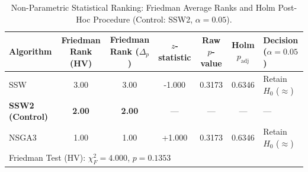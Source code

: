 \begin{table}[htbp]
\caption{Non-Parametric Statistical Ranking: Friedman Average Ranks and Holm Post-Hoc Procedure (Control: SSW2, $\alpha = 0.05$).}
\label{tab:ssw_friedman_holm}
\centering\small
\begin{tabular}{@{}l c c c c c l@{}}
\toprule
Algorithm & Friedman Rank (HV) & Friedman Rank ($\Delta_p$) & $z$-statistic & Raw $p$-value & Holm $p_{\text{adj}}$ & Decision ($\alpha=0.05$) \\
\midrule
SSW & 3.00 & 3.00 & -1.000 & 0.3173 & 0.6346 & Retain $H_0$ ($\approx$) \\
\textbf{SSW2 (Control)} & \textbf{2.00} & \textbf{2.00} & --- & --- & --- & --- \\
NSGA3 & 1.00 & 1.00 & +1.000 & 0.3173 & 0.6346 & Retain $H_0$ ($\approx$) \\
\midrule
\multicolumn{7}{l}{Friedman Test (HV): $\chi_F^2 = 4.000$, $p = 0.1353$} \\
\bottomrule
\end{tabular}
\end{table}
